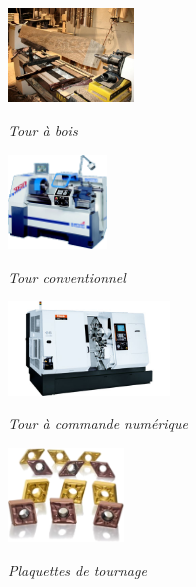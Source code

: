 \documentclass[11pt,oneside]{article}
\begin{document}
\begin{minipage}[c]{.23\linewidth}
\begin{center}
\includegraphics[height=2.5cm]{png/tour_bois}

\textit{Tour à bois \cite{tab}}
\end{center}
\end{minipage} \hfill
\begin{minipage}[c]{.23\linewidth}
\begin{center}
\includegraphics[height=2.5cm]{png/cazeneuve}

\textit{Tour conventionnel \cite{cazeneuve}}
\end{center}
\end{minipage} \hfill
\begin{minipage}[c]{.23\linewidth}
\begin{center}
\includegraphics[height=2.5cm]{png/tour_mazak}

\textit{Tour à commande numérique \cite{mazak}}
\end{center}
\end{minipage}\hfill
\begin{minipage}[c]{.23\linewidth}
\begin{center}
\includegraphics[height=2.5cm]{png/plaquettes}

\textit{Plaquettes de tournage \cite{plaquettes}}
\end{center}
\end{minipage}
\end{document}
